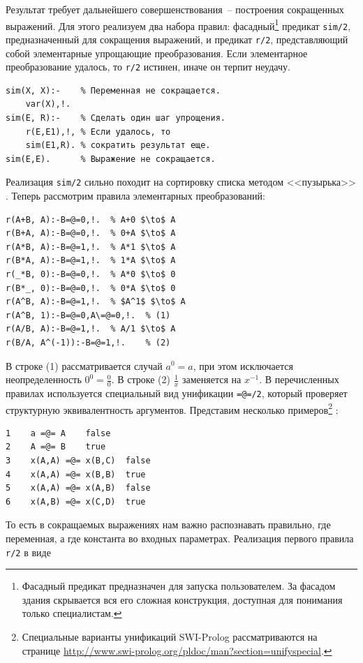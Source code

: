\documentclass[a4paper,14pt, openany, twoside, draft]{extbook} %
\begin{document}
Результат требует дальнейшего совершенствования~-- построения сокращенных выражений.  Для этого реализуем два набора правил: фасадный\footnote{Фасадный предикат предназначен для запуска пользователем.  За фасадом здания скрывается вся его сложная конструкция, доступная для понимания только специалистам. } предикат \texttt{sim/2}, предназначенный для сокращения выражений, и предикат \texttt{r/2}, представляющий собой элементарные упрощающие преобразования.  Если элементарное преобразование удалось, то \texttt{r/2} истинен, иначе он терпит неудачу.

\begin{verbatim}
sim(X, X):-    % Переменная не сокращается.
    var(X),!.
sim(E, R):-    % Сделать один шаг упрощения.
    r(E,E1),!, % Если удалось, то
    sim(E1,R). % сократить результат еще.
sim(E,E).      % Выражение не сокращается.
\end{verbatim}

\noindent{}Реализация \texttt{sim/2} сильно походит на сортировку списка методом <<пузырька>> \cite{ais}.  Теперь рассмотрим правила элементарных преобразований:

\begin{verbatim}
r(A+B, A):-B=@=0,!.  % A+0 $\to$ A
r(B+A, A):-B=@=0,!.  % 0+A $\to$ A
r(A*B, A):-B=@=1,!.  % A*1 $\to$ A
r(B*A, A):-B=@=1,!.  % 1*A $\to$ A
r(_*B, 0):-B=@=0,!.  % A*0 $\to$ 0
r(B*_, 0):-B=@=0,!.  % 0*A $\to$ 0
r(A^B, A):-B=@=1,!.  % $A^1$ $\to$ A
r(A^B, 1):-B=@=0,A\=@=0,!.  % (1)
r(A/B, A):-B=@=1,!.  % A/1 $\to$ A
r(B/A, A^(-1)):-B=@=1,!.    % (2)
\end{verbatim}

В строке (1) рассматривается случай $a^0=a$, при этом исключается неопределенность $0^0=\frac{0}{0}$.  В строке (2) $\frac{1}{x}$ заменяется на $x^{-1}$.  В перечисленных правилах используется специальный вид унификации \texttt{=@=/2}, который проверяет структурную эквивалентность аргументов.  Представим несколько примеров\footnote{Специальные варианты унификаций SWI-Prolog рассматриваются на странице \url{http://www.swi-prolog.org/pldoc/man?section=unifyspecial}.} \cite{SWIP}:

\begin{verbatim}
1    a =@= A    false
2    A =@= B    true
3    x(A,A) =@= x(B,C)  false
4    x(A,A) =@= x(B,B)  true
5    x(A,A) =@= x(A,B)  false
6    x(A,B) =@= x(C,D)  true
\end{verbatim}

То есть в сокращаемых выражениях нам важно распознавать правильно, где переменная, а где константа во входных параметрах.  Реализация первого правила \texttt{r/2} в виде
\end{document}
